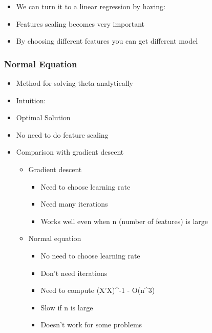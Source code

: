 \documentclass[]{article}
\providecommand{\tightlist}{%
  \setlength{\itemsep}{0pt}\setlength{\parskip}{0pt}}
\begin{document}
\begin{itemize}
\tightlist
\item
  We can turn it to a linear regression by having:
\end{itemize}

\begin{itemize}
\tightlist
\item
  Features scaling becomes very important
\item
  By choosing different features you can get different model
\end{itemize}

\hypertarget{normal-equation}{%
\subsubsection{Normal Equation}\label{normal-equation}}

\begin{itemize}
\tightlist
\item
  Method for solving theta analytically
\item
  Intuition:
\end{itemize}

\begin{itemize}
\tightlist
\item
  Optimal Solution
\end{itemize}

\begin{itemize}
\tightlist
\item
  No need to do feature scaling
\item
  Comparison with gradient descent

  \begin{itemize}
  \tightlist
  \item
    Gradient descent

    \begin{itemize}
    \tightlist
    \item
      Need to choose learning rate
    \item
      Need many iterations
    \item
      Works well even when n (number of features) is large
    \end{itemize}
  \item
    Normal equation

    \begin{itemize}
    \tightlist
    \item
      No need to choose learning rate
    \item
      Don't need iterations
    \item
      Need to compute (X'X)\^{}-1 - O(n\^{}3)
    \item
      Slow if n is large
    \item
      Doesn't work for some problems
    \end{itemize}
  \end{itemize}
\end{itemize}
\end{document}
